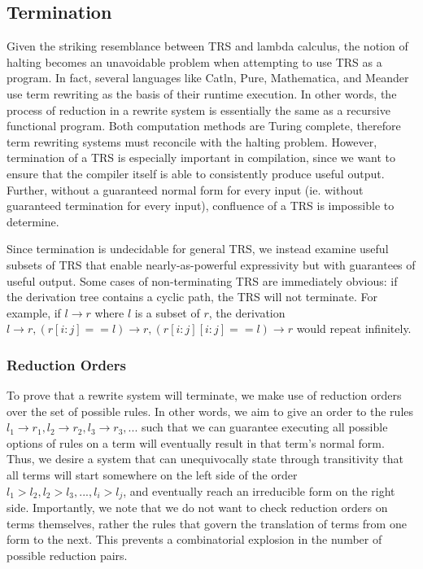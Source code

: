 \documentclass{article}
\begin{document}
\subsection{Termination}
Given the striking resemblance between TRS and lambda calculus,
the notion of halting becomes an unavoidable problem when attempting to use TRS as a program.
In fact, several languages like Catln, Pure, Mathematica, and Meander use term rewriting as the basis of their runtime execution.
In other words, the process of reduction in a rewrite system is essentially the same as a recursive functional program.
Both computation methods are Turing complete, therefore term rewriting systems must reconcile with the halting problem.
However, termination of a TRS is especially important in compilation, since we want to ensure that the compiler itself
is able to consistently produce useful output.
Further, without a guaranteed normal form for every input (ie. without guaranteed termination for every input),
confluence of a TRS is impossible to determine.

Since termination is undecidable for general TRS, we instead examine useful subsets of TRS
that enable nearly-as-powerful expressivity but with guarantees of useful output.
Some cases of non-terminating TRS are immediately obvious: if the derivation tree contains a cyclic path,
the TRS will not terminate. For example, if $l \rightarrow r$ where $l$ is a subset of $r$, the derivation
$l \rightarrow r, (r[i:j] == l) \rightarrow r, (r[i:j][i:j] == l) \rightarrow r$ would repeat infinitely.

\subsubsection{Reduction Orders}
To prove that a rewrite system will terminate, we make use of reduction orders over the set of possible rules.
In other words, we aim to give an order to the rules $l_1 \rightarrow r_1,l_2 \rightarrow r_2,l_3 \rightarrow r_3,...$
such that we can guarantee executing all possible options of rules on a term will eventually result in that term's normal form.
Thus, we desire a system that can unequivocally state through transitivity that all terms will start somewhere on the left side of the order $l_1 > l_2, l_2 > l_3, ..., l_i > l_j$,
and eventually reach an irreducible form on the right side.
Importantly, we note that we do not want to check reduction orders on terms themselves, rather the rules that govern the translation of terms from one form to the next.
This prevents a combinatorial explosion in the number of possible reduction pairs.
\end{document}
